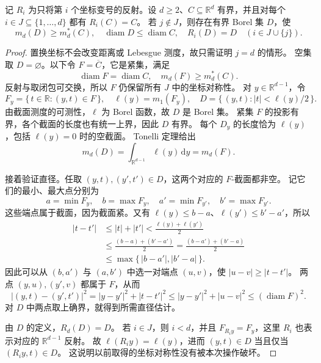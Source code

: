\begin{lemma}[逐坐标对称化]\label{b1:lem:coordinate-symmetrization}
记 \(R_i\) 为只将第 \(i\) 个坐标变号的反射。设 \(d\geq2\)、\(C\subseteq\mathbb R^d\) 有界，并且对每个 \(i\in J\subseteq\{1,\ldots,d\}\) 都有 \(R_i(C)=C\)。
若 \(j\notin J\)，则存在有界 Borel 集 \(D\)，使
\[
 m_d(D)\geq m_d^*(C),\quad
 \operatorname{diam}D\leq\operatorname{diam}C,
 \quad R_i(D)=D\quad(i\in J\cup\{j\}).
\]
\end{lemma}
\begin{proof}
置换坐标不会改变距离或 Lebesgue 测度，故只需证明 \(j=d\) 的情形。
空集取 \(D=\varnothing\)。以下令 \(F=\overline C\)，它是紧集，满足
\[
 \operatorname{diam}F=\operatorname{diam}C,
 \quad m_d(F)\geq m_d^*(C).
\]
反射与取闭包可交换，所以 \(F\) 仍保留所有 \(J\) 中的坐标对称性。
对 \(y\in\mathbb R^{d-1}\)，令
\[
 F_y=\{\,t\in\mathbb R:(y,t)\in F\,\},\quad
 \ell(y)=m_1(F_y),\quad
 D=\{\,(y,t):|t|<\ell(y)/2\,\}.
\]
由截面测度的可测性，\(\ell\) 为 Borel 函数，故 \(D\) 是 Borel 集。
紧集 \(F\) 的投影有界，各个截面的长度也有统一上界，因此 \(D\) 有界。
每个 \(D_y\) 的长度恰为 \(\ell(y)\)，包括 \(\ell(y)=0\) 时的空截面。
Tonelli 定理给出
\[
 m_d(D)=\int_{\mathbb R^{d-1}}\ell(y)\,\mathrm dy=m_d(F).
\]

接着验证直径。任取 \((y,t),(y',t')\in D\)，这两个对应的 \(F\)-截面都非空。
记它们的最小、最大点分别为
\[
 a=\min F_y,\quad b=\max F_y,
 \quad a'=\min F_{y'},\quad b'=\max F_{y'}.
\]
这些端点属于截面，因为截面紧。又有 \(\ell(y)\leq b-a\)、\(\ell(y')\leq b'-a'\)，所以
\[
 \begin{aligned}
 |t-t'|
 &\leq|t|+|t'|
 <\frac{\ell(y)+\ell(y')}{2}\\
 &\leq\frac{(b-a)+(b'-a')}{2}
 =\frac{(b-a')+(b'-a)}2\\
 &\leq\max\{\,|b-a'|,|b'-a|\,\}.
 \end{aligned}
\]
因此可以从 \((b,a')\) 与 \((a,b')\) 中选一对端点 \((u,v)\)，使 \(|u-v|\geq|t-t'|\)。
两点 \((y,u),(y',v)\) 都属于 \(F\)，从而
\[
 |(y,t)-(y',t')|^2
 =|y-y'|^2+|t-t'|^2
 \leq|y-y'|^2+|u-v|^2
 \leq(\operatorname{diam}F)^2.
\]
对 \(D\) 中两点取上确界，就得到所需直径估计。

由 \(D\) 的定义，\(R_d(D)=D\)。
若 \(i\in J\)，则 \(i<d\)，并且 \(F_{R_i y}=F_y\)，这里 \(R_i\) 也表示对应的 \(\mathbb R^{d-1}\) 反射。
故 \(\ell(R_i y)=\ell(y)\)，进而 \((y,t)\in D\) 当且仅当 \((R_i y,t)\in D\)。
这说明以前取得的坐标对称性没有被本次操作破坏。
\end{proof}

